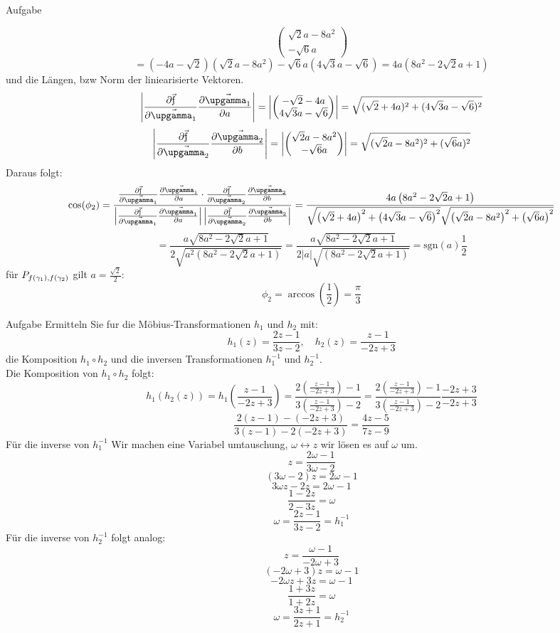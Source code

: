 \documentclass{scrartcl}
\begin{document}
\begin{section}{Aufgabe}
\begin{itemize}
\[\begin{pmatrix}
    \sqrt{2} a-8 a^2  \\
    -\sqrt{6} a
\end{pmatrix}\]
\[=\left(-4 a-\sqrt{2}\right) \left(\sqrt{2} a-8 a^2\right)-\sqrt{6} a \left(4 \sqrt{3} a-\sqrt{6}\right)
=4 a \left(8 a^2-2 \sqrt{2} a+1\right)\] und die Längen, bzw Norm der liniearisierte Vektoren. 
\[\left|\pfa\right|=\left|\begin{pmatrix}
    -\sqrt{2}-4a\\
    4\sqrt{3}a-\sqrt{6}
\end{pmatrix}\right|=\sqrt{(\sqrt{2}+4a)^2+(4\sqrt{3}a-\sqrt{6})^2}\] 
\[\left|\pfb\right|=\left|\begin{pmatrix}
    \sqrt{2} a-8 a^2  \\
    -\sqrt{6} a
\end{pmatrix}\right|=\sqrt{(\sqrt{2}a-8a^2)^2+(\sqrt{6} a)^2}\] 
Daraus folgt:
\[\cos(\phi_2)=\frac{\pfa\cdot\pfb}{\left|\pfa\right|\left|\pfb\right|}
=\frac{4 a \left(8 a^2-2 \sqrt{2} a+1\right)}{\sqrt{\left(\sqrt{2}+4a\right)^2+\left(4\sqrt{3}a-\sqrt{6}\right)^2}\sqrt{\left(\sqrt{2}a-8a^2\right)^2+\left(\sqrt{6} a\right)^2}}
\]
\[=\frac{a \sqrt{8 a^2-2 \sqrt{2} a+1}}{2 \sqrt{a^2 \left(8 a^2-2 \sqrt{2} a+1\right)}}
=\frac{a \sqrt{8 a^2-2 \sqrt{2} a+1}}{2 \left|a\right| \sqrt{ \left(8 a^2-2 \sqrt{2} a+1\right)}}=\text{sgn}(a)\frac{1}{2}\]
für \(\schnt{f(\gamma_1)}{f(\gamma_2)}{P}\) gilt $a=\frac{\sqrt 2}{2}$:
\[\phi_2=\arccos(\frac{1}{2})=\frac{\pi}{3}\]
\end{itemize}


\end{section}
\begin{section}{Aufgabe}%
Ermitteln Sie fur die Möbius-Transformationen $h_1$ und $h_2$ mit:
\[h_1(z)=\frac{2z-1}{3z-2},\quad h_2(z)=\frac{z-1}{-2z+3}\]
die Komposition $h_1 \circ h_2$ und die inversen Transformationen $h_1^{-1}$ und $h_2^{-1}$.
\\
Die Komposition von $h_1 \circ h_2$ folgt:
\[h_1(h_2(z))=h_1\left(\frac{z-1}{-2z+3}\right)=\frac{2\left(\frac{z-1}{-2z+3}\right)-1}{3\left(\frac{z-1}{-2z+3}\right)-2}=\frac{2\left(\frac{z-1}{-2z+3}\right)-1}{3\left(\frac{z-1}{-2z+3}\right)-2}\frac{-2z+3}{-2z+3}\]
\[\frac{2 (z-1)-(-2z+3)}{3\left(z-1\right)-2(-2z+3)}=\frac{4 z -5}{7 z -9}\]
Für die inverse von $h_1^{-1}$
Wir machen eine Variabel umtauschung, \(\omega \longleftrightarrow z\)
wir lösen es auf $\omega$ um.
\[z=\frac{2\omega -1}{3 \omega -2}\]
\[(3 \omega -2)z=2\omega -1\]
\[3\omega z -2z=2\omega -1\]
\[\frac{1 -2z}{2-3z}=\omega\]
\[\omega=\frac{2z-1}{3z-2}=h_1^{-1}\]
Für die inverse von $h_2^{-1}$ folgt analog:
\[z=\frac{\omega -1}{-2 \omega+3}\]
\[(-2 \omega+3)z=\omega -1\]
\[-2 \omega z+3z=\omega -1\]
\[\frac{1 +3z}{1+2z}=\omega\]
\[\omega=\frac{3z+1}{2z+1}=h_2^{-1}\]
\end{section}
\end{document}
